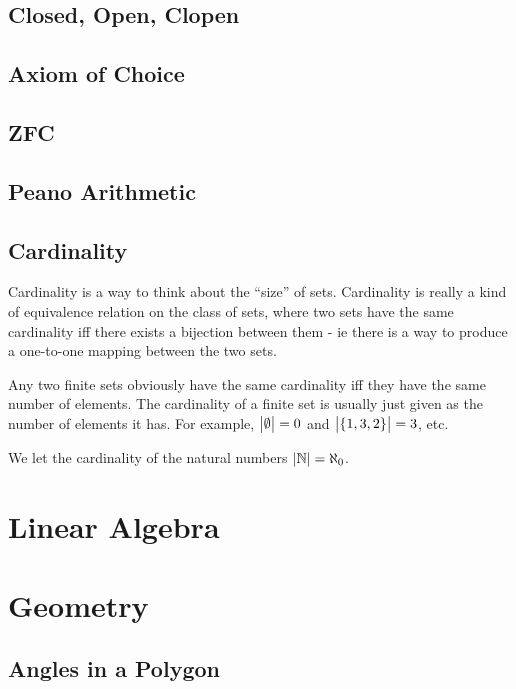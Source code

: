 \documentclass[fleqn,a4paper,11pt]{article}
\begin{document}
    \subsection{Closed, Open, Clopen}

    \subsection{Axiom of Choice}

    \subsection{ZFC}

    \subsection{Peano Arithmetic}

    \subsection{Cardinality}


    Cardinality is a way to think about the ``size'' of sets. Cardinality is
    really a kind of equivalence relation on the class of sets, where two sets
    have the same cardinality iff there exists a bijection between them - ie
    there is a way to produce a one-to-one mapping between the two sets.

    Any two finite sets obviously have the same cardinality iff they have the
    same number of elements. The cardinality of a finite set is usually just
    given as the number of elements it has. For example, \(\abs{\emptyset} = 0\)
    and \(\abs{\set{1, 3, 2}} = 3\), etc.

    We let the cardinality of the natural numbers \(\abs{\mathbb{N}} = \aleph_0\).

    \section{Linear Algebra}

    \section{Geometry}

    \subsection{Angles in a Polygon} \label{sec:geom_polygon_angles}
\end{document}
